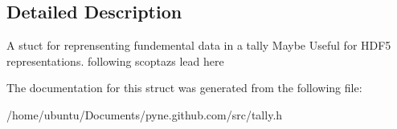 \subsection{Detailed Description}
A stuct for reprensenting fundemental data in a tally Maybe Useful for H\+D\+F5 representations. following scoptaz\textquotesingle{}s lead here 

The documentation for this struct was generated from the following file\+:\begin{DoxyCompactItemize}
\item 
/home/ubuntu/\+Documents/pyne.\+github.\+com/src/tally.\+h\end{DoxyCompactItemize}
